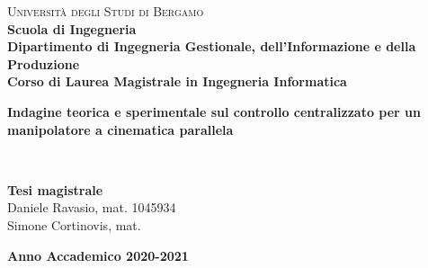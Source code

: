 \begin{titlepage}

\noindent
\begin{minipage}[t]{0.19\textwidth}

\end{minipage}
\begin{minipage}[t]{0.81\textwidth}
{
	{\textsc{Università degli Studi di Bergamo}} \\
	\textbf{Scuola di Ingegneria} \\
	\textbf{Dipartimento di Ingegneria Gestionale, dell'Informazione e della Produzione} \\
	\textbf{Corso di Laurea Magistrale in Ingegneria Informatica} \\
	\par
}
\end{minipage}

\vspace{35mm}

\begin{center}
	{\LARGE{
			\textbf{Indagine teorica e sperimentale sul controllo centralizzato per un manipolatore a cinematica parallela} \\
			\textbf{}
			\par
	}}
\end{center}

\vspace{40mm}

\noindent
{\large} \\

\vspace{20mm}

\begin{flushright}
	{\large \textbf{Tesi magistrale}} \\
	\large{Daniele Ravasio, mat. 1045934} \\
	\large{Simone Cortinovis, mat. } \\
\end{flushright}

\vspace{10mm}

\begin{center}
    {\large{\bf Anno Accademico 2020-2021}}
\end{center}

\restoregeometry

\end{titlepage}